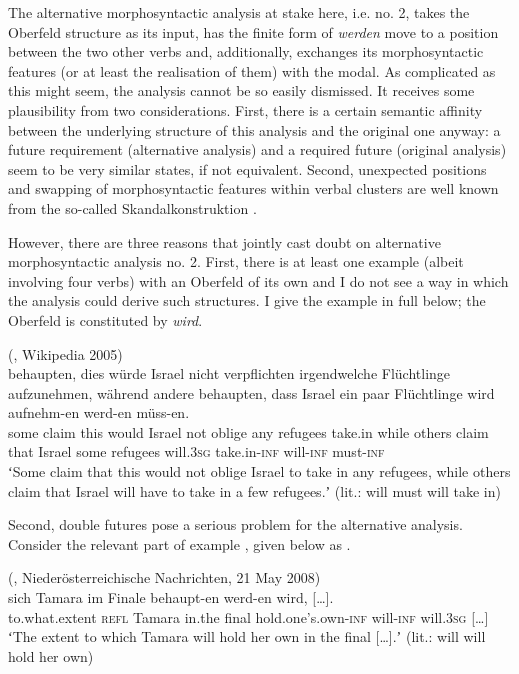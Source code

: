 \documentclass[output=paper,hidelinks]{langscibook}
\begin{document}
The alternative morphosyntactic analysis at stake here, i.e. no. 2, takes the Oberfeld structure as its input, has the finite form of \emph{werden} move to a position between the two other verbs and, additionally, exchanges its morphosyntactic features (or at least the realisation of them) with the modal. As complicated as this might seem, the analysis cannot be so easily dismissed. It receives some plausibility from two considerations. First, there is a certain semantic affinity between the underlying structure of this analysis and the original one anyway: a future requirement (alternative analysis) and a required future (original analysis) seem to be very similar states, if not equivalent.  Second, unexpected positions and swapping of morphosyntactic features within  verbal clusters are well known from the so-called Skandalkonstruktion \citep{Vogel2009}.\largerpage[-1]

However, there are three reasons that jointly cast doubt on alternative morphosyntactic analysis no. 2. First, there is at least one example (albeit involving four verbs) with an Oberfeld of its own and I do not see a way in which the analysis could derive such structures. I give the example in full below; the Oberfeld is constituted by \emph{wird}.

\ea\label{ex:reiner:34} 	 (, Wikipedia 2005) \\
	{behaupten,}	{dies}	{würde}		{Israel}  {nicht}	{verpflichten}	{irgendwelche}	{Flüchtlinge} {aufzunehmen,}	{während}	{andere}	{behaupten,}  {dass}	{Israel}		{ein} {paar}	{Flüchtlinge} {wird}		{aufnehm-en}		{werd-en}	{müss-en.}\\
some	claim		this	would		Israel  not	oblige		any			refugees    take.in		while		others		claim   that	Israel		some    {}		refugees    will.\textsc{3sg}		take.in-\textsc{inf}		will-\textsc{inf}	must-\textsc{inf}\\
\glt ʻSome claim that this would not oblige Israel to take in any refugees, while others claim that Israel will have to take in a few refugees.ʼ (lit.: will must will take in)
\z 

Second, double futures pose a serious problem for the alternative analysis. Consider the relevant part of example , given below as .

\ea\label{ex:reiner:35}  (, Niederösterreichische Nachrichten, 21 May 2008) \\
		{sich}	{Tamara}	{im}	{Finale}  {behaupt-en}			{werd-en}	{wird,} […].\\
to.what.extent		\textsc{refl}	Tamara	in.the	final   hold.one’s.own-\textsc{inf}		will-\textsc{inf}	will.\textsc{3sg} […] \\
\glt ʻThe extent to which Tamara will hold her own in the final […].ʼ (lit.: will will hold her own)
\z 
\end{document}
